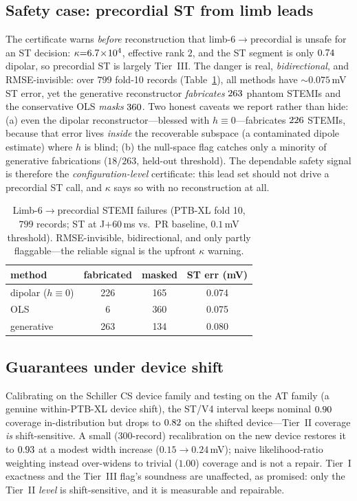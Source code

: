 \subsection{Safety case: precordial ST from limb leads}
The certificate warns \emph{before} reconstruction that limb-6$\to$precordial is
unsafe for an ST decision: $\kappa{=}6.7\!\times\!10^{4}$, effective rank $2$, and the ST segment
is only $0.74$ dipolar, so precordial ST is largely Tier~III. The danger is real,
\emph{bidirectional}, and RMSE-invisible: over $799$ fold-10 records
(Table~\ref{tab:stemi}), all methods have $\sim\!0.075$\,mV ST error, yet the
generative reconstructor \emph{fabricates} $263$ phantom STEMIs and the conservative
OLS \emph{masks} $360$. Two honest caveats we report rather than hide: (a) even the
dipolar reconstructor---blessed with $h{\equiv}0$---fabricates $226$ STEMIs,
because that error lives \emph{inside} the recoverable subspace (a contaminated dipole
estimate) where $h$ is blind; (b) the null-space flag catches only a minority of
generative fabrications ($18/263$, held-out threshold). The dependable safety signal is therefore the
\emph{configuration-level} certificate: this lead set should not drive a precordial ST
call, and $\kappa$ says so with no reconstruction at all.

\begin{table}[t]
\centering
\caption{Limb-6$\to$precordial STEMI failures (PTB-XL fold 10, $799$ records; ST at
J$+$60\,ms vs.\ PR baseline, $0.1$\,mV threshold). RMSE-invisible, bidirectional, and
only partly flaggable---the reliable signal is the upfront $\kappa$ warning.}
\label{tab:stemi}
\small
\begin{tabular}{lccc}
\toprule
method & fabricated & masked & ST err (mV) \\
\midrule
dipolar ($h{\equiv}0$) & 226 & 165 & 0.074 \\
OLS                    & 6   & 360 & 0.075 \\
generative             & 263 & 134 & 0.080 \\
\bottomrule
\end{tabular}
\end{table}

\subsection{Guarantees under device shift}
Calibrating on the Schiller CS device family and testing on the AT family (a genuine
within-PTB-XL device shift), the ST/V4 interval keeps nominal $0.90$ coverage
in-distribution but drops to $0.82$ on the shifted device---Tier~II coverage
\emph{is} shift-sensitive. A small ($300$-record) recalibration on the new device
restores it to $0.93$ at a modest width increase ($0.15\!\to\!0.24$\,mV); naive
likelihood-ratio weighting instead over-widens to trivial ($1.00$) coverage and is not
a repair. Tier~I exactness and the Tier~III flag's soundness are unaffected, as
promised: only the Tier~II \emph{level} is shift-sensitive, and it is measurable and
repairable.

